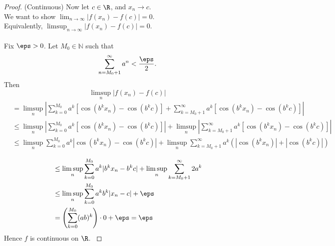 \documentclass[fontsize=14pt]{scrartcl}
\begin{document}
\begin{proof}
    (Continuous) Now let $c \in \R$, and $x_n \to c$. \\ We want to show $\lim_{n \to \infty}|f(x_n) -f(c)| = 0.$
    \\Equivalently, $\limsup_{n \to \infty} |f(x_n) -f(c)| = 0.$ \\ \\
    Fix $\eps > 0$. Let $M_0 \in \mathbb{N}$ such that
    \begin{equation}
        \sum_{n=M_0+1}^{\infty}a^n < \frac{\eps}{2}.
    \end{equation}
    Then
    \begin{equation}
        \limsup_{n}|f(x_n) - f(c)|
    \end{equation}
    \begin{equation*}
        \begin{aligned}
             &= \limsup_{n}\left|\sum_{k=0}^{M_0} a^k [\cos(b^k x_n)-\cos(b^k c)]
            +\sum_{k=M_0+1}^{\infty} a^k [\cos(b^k x_n)-\cos(b^k c)]\right| \\
            &\leq \limsup_{n}\left|\sum_{k=0}^{M_0} a^k [\cos(b^k x_n)-\cos(b^k c)]\right| 
            + \limsup_{n} \left|\sum_{k=M_0+1}^{\infty} a^k [\cos(b^k x_n)-\cos(b^k c)]\right| \\
            &\leq \limsup_{n}\sum_{k=0}^{M_0} a^k |\cos(b^k x_n)-\cos(b^k c)| 
            + \limsup_{n} \sum_{k=M_0+1}^{\infty} a^k (|\cos(b^k x_n)|+|\cos(b^k c)|)\\
        \end{aligned}     
    \end{equation*}
    \begin{equation*}
        \begin{aligned}
            &\leq \limsup_{n}\sum_{k=0}^{M_0} a^k |b^k x_n-b^k c| 
            + \limsup_{n} \sum_{k=M_0+1}^{\infty} 2 a^k \\
            &\leq \limsup_{n}\sum_{k=0}^{M_0} a^kb^k |x_n - c| 
            + \eps \\
            &= \left( \sum_{k=0}^{M_0} (ab)^k \right) \cdot 0 + \eps = \eps
        \end{aligned}
    \end{equation*}
    Hence $f$ is continuous on $\R$.  \cite{MITRealAnalysisLecture18}
\end{proof} 

\newpage
\end{document}

